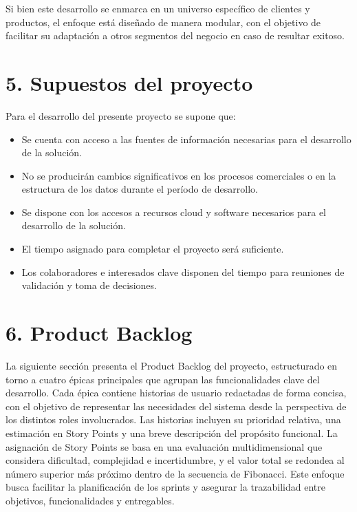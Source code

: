 \documentclass[
11pt, %
]{charter}
\begin{document}
Si bien este desarrollo se enmarca en un universo específico de clientes y productos, el enfoque está diseñado de manera modular, con el objetivo de facilitar su adaptación a otros segmentos del negocio en caso de resultar exitoso.

\section{5. Supuestos del proyecto}
\label{sec:supuestos}

Para el desarrollo del presente proyecto se supone que: 
\begin{itemize}
	\item Se cuenta con acceso a las fuentes de información necesarias para el desarrollo de la solución. 
        \item No se producirán cambios significativos en los procesos comerciales o en la estructura de los datos durante el período de desarrollo.
	\item Se dispone con los accesos a recursos cloud y software necesarios para el desarrollo de la solución. 
	\item El tiempo asignado para completar el proyecto será suficiente.
        \item Los colaboradores e interesados clave disponen del tiempo para reuniones de validación y toma de decisiones.
\end{itemize}

\section{6. Product Backlog}
\label{sec:backlog}

La siguiente sección presenta el Product Backlog del proyecto, estructurado en torno a cuatro épicas principales que agrupan las funcionalidades clave del desarrollo. Cada épica contiene historias de usuario redactadas de forma concisa, con el objetivo de representar las necesidades del sistema desde la perspectiva de los distintos roles involucrados. Las historias incluyen su prioridad relativa, una estimación en Story Points y una breve descripción del propósito funcional. La asignación de Story Points se basa en una evaluación multidimensional que considera dificultad, complejidad e incertidumbre, y el valor total se redondea al número superior más próximo dentro de la secuencia de Fibonacci. Este enfoque busca facilitar la planificación de los sprints y asegurar la trazabilidad entre objetivos, funcionalidades y entregables.
\end{document}
